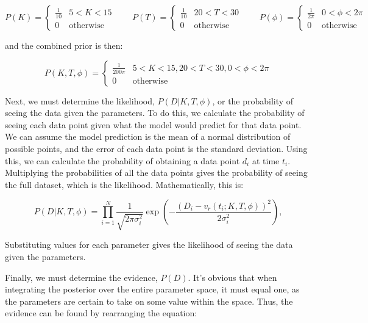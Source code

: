\documentclass[preprint,longauthor]{aastex631}
\numberwithin{equation}{section}
\begin{document}
\begin{equation*}
  P(K) = \begin{cases}
    \frac{1}{10} & 5 < K < 15 \\
    0 & \text{otherwise}
  \end{cases} \qquad
  P(T) = \begin{cases}
    \frac{1}{10} & 20 < T < 30 \\
    0 & \text{otherwise}
  \end{cases} \qquad
  P(\phi) = \begin{cases}
    \frac{1}{2\pi} & 0 < \phi < 2\pi \\
    0 & \text{otherwise}
  \end{cases}
\end{equation*}

and the combined prior is then:

\begin{equation}
  P(K,T,\phi) = \begin{cases}
    \frac{1}{200\pi} & 5 < K < 15, 20 < T < 30, 0 < \phi < 2\pi \\
    0 & \text{otherwise}
  \end{cases}
\end{equation}

Next, we must determine the likelihood, $P(D|K,T,\phi)$, or the probability of seeing the data given the parameters. To do this, we calculate the probability of seeing each data point given what the model would predict for that data point. We can assume the model prediction is the mean of a normal distribution of possible points, and the error of each data point is the standard deviation. Using this, we can calculate the probability of obtaining a data point $d_i$ at time $t_i$. Multiplying the probabilities of all the data points gives the probability of seeing the full dataset, which is the likelihood. Mathematically, this is:

\begin{equation}
  P(D|K,T,\phi) = \prod_{i=1}^{N} \frac{1}{\sqrt{2\pi\sigma_i^2}} \exp\left(-\frac{(D_i - v_r(t_i;K,T,\phi))^2}{2\sigma_i^2}\right),
\end{equation}

Substituting values for each parameter gives the likelihood of seeing the data given the parameters.

Finally, we must determine the evidence, $P(D)$. It's obvious that when integrating the posterior over the entire parameter space, it must equal one, as the parameters are certain to take on some value within the space. Thus, the evidence can be found by rearranging the equation:
\end{document}
